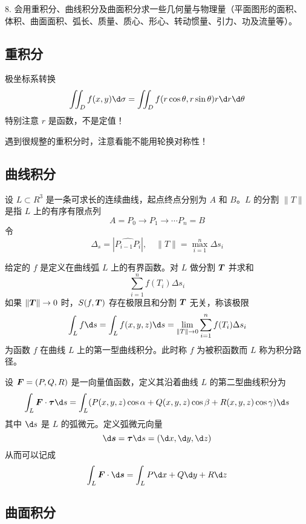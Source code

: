 8. 会用重积分、曲线积分及曲面积分求一些几何量与物理量（平面图形的面积、体积、曲面面积、弧长、质量、质心、形心、转动惯量、引力、功及流量等）。

\subsection{重积分}

极坐标系转换
\[ \iint_{D} f(x, y) \d \sigma = \iint_{D} f(r \cos \theta, r \sin \theta) r \d r \d \theta  \]
特别注意 $r$ 是函数，不是定值！

\begin{note}
	遇到很规整的重积分时，注意看能不能用轮换对称性！
\end{note}

\subsection{曲线积分}

设 $L \subset R^3$ 是一条可求长的连续曲线，起点终点分别为 $A$ 和 $B$。$L$ 的分割 $\|T\|$ 是指 $L$ 上的有序有限点列
\[ A = P_0 \to P_1 \to \cdots P_n = B \]
令
\[ \Delta_s = \left| \widehat{P_{i-1}P_i} \right|, \quad \|T\| = \max_{i=1}^n \Delta s_i \]

\begin{definition}[第一型曲线积分]
	给定的 $f$ 是定义在曲线弧 $L$ 上的有界函数。对 $L$ 做分割 $\boldsymbol{T}$ 并求和
	\[ \sum_{i=1}^{n} f(T_i) \Delta s_i \]
	如果 $\|\boldsymbol{T}\| \to 0$ 时，$S(f, \boldsymbol{T})$ 存在极限且和分割 $\boldsymbol{T}$ 无关，称该极限
	\[ \int_L f \d s = \int_{L} f(x, y, z) \d s = \lim_{\|T\| \to 0} \sum_{i=1}^{n} f(T_i) \Delta s_i \]
	为函数 $f$ 在曲线 $L$ 上的第一型曲线积分。此时称 $f$ 为被积函数而 $L$ 称为积分路径。
\end{definition}

\begin{definition}[第二型曲线积分]
	设 $\boldsymbol{F} = (P, Q, R)$ 是一向量值函数，定义其沿着曲线 $L$ 的第二型曲线积分为
	\[ \int_L \vbf{F} \cdot \vbf{\tau} \d s = \int_L (P(x,y,z) \cos \alpha + Q(x, y, z) \cos \beta + R(x, y, z) \cos \gamma) \d s \]
	其中 $\d s$ 是 $L$ 的弧微元。定义弧微元向量
	\[ \d \vbf{s} = \vbf{\tau} \d s = (\d x, \d y, \d z) \]
	从而可以记成
	\[ \int_L \vbf{F} \cdot \d \vbf{s} = \int_L P \d x + Q \d y + R \d z \]
\end{definition}

\subsection{曲面积分}

